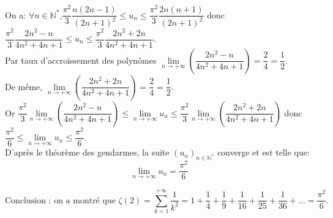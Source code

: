 \documentclass[a4paper,french,bookmarks]{article}
\begin{document}
\begin{enumerate}
\begin{enumerate}
\begin{tcolorbox}[colback=black!8,colframe=black!9,boxrule=.25pt,enhanced,arc is angular,arc=0pt]
            On a: \qquad $\displaystyle\forall n \in \mathbb{N}^*$,\quad $\displaystyle\dfrac{\pi^2}{3}\dfrac{n(2n-1)}{(2n+1)^2}\leq u_n \leq \dfrac{\pi^2}{3}\dfrac{2n(n+1)}{(2n+1)^2}$ donc $\displaystyle\dfrac{\pi^2}{3}\dfrac{2n^2-n}{4n^2+4n+1}\leq u_n \leq \dfrac{\pi^2}{3}\dfrac{2n^2+2n}{4n^2+4n+1}$.\\
            Par taux d'accroissement des polynômes $\displaystyle\lim\limits_{n \to +\infty}\left(\dfrac{2n^2-n}{4n^2+4n+1}\right)=\dfrac{2}{4}=\dfrac{1}{2}$.\\
            De même, $\displaystyle\lim\limits_{n \to +\infty}\left(\dfrac{2n^2+2n}{4n^2+4n+1}\right)=\dfrac{2}{4}=\dfrac{1}{2}$.\\
            Or $\displaystyle\dfrac{\pi^2}{3}\lim\limits_{n \to +\infty}\left(\dfrac{2n^2-n}{4n^2+4n+1}\right)\leq \lim\limits_{n \to +\infty}u_n \leq \dfrac{\pi^2}{3}\lim\limits_{n \to +\infty}\left(\dfrac{2n^2+2n}{4n^2+4n+1}\right)$ donc $\displaystyle\dfrac{\pi^2}{6}\leq \lim\limits_{n \to +\infty}u_n \leq \dfrac{\pi^2}{6}$.\\
            
            D'après le théorème des gendarmes, la suite $\left(u_n\right)_{n \in \mathbb{N}^*}$ converge et est telle que:
            \[\lim\limits_{n \to +\infty}u_n = \dfrac{\pi^2}{6}\]
            \text{}\newline
            \end{tcolorbox}
            \text{}\newline
            \begin{equation*}
                    \boxed{\text{Conclusion : on a montré que } \zeta(2) = \sum_{k=1}^{+\infty} \dfrac{1}{k^2} = 1 + \dfrac{1}{4} + \dfrac{1}{9} + \dfrac{1}{16} + \dfrac{1}{25} + \dfrac{1}{36} + \dots = \dfrac{\pi^2}{6}.}
                \end{equation*}
        \end{enumerate}
\end{enumerate}




\newpage
\end{document}
